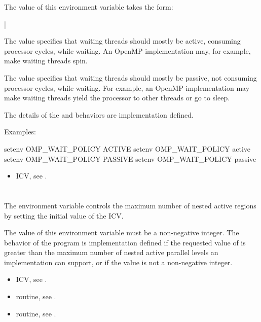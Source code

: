 The value of this environment variable takes the form:

{|}

The  value specifies that waiting threads should mostly be active, consuming
processor cycles, while waiting. An OpenMP implementation may, for example, make
waiting threads spin.

The  value specifies that waiting threads should mostly be passive, not
consuming processor cycles, while waiting. For example, an OpenMP implementation
may make waiting threads yield the processor to other threads or go to sleep.

The details of the  and  behaviors are implementation defined.

Examples:
\begin{ompEnv}
setenv OMP_WAIT_POLICY ACTIVE
setenv OMP_WAIT_POLICY active
setenv OMP_WAIT_POLICY PASSIVE
setenv OMP_WAIT_POLICY passive
\end{ompEnv}

\crossreferences
\begin{itemize}
\item {} ICV, see .
\end{itemize}










\section{}
\label{sec:OMP_MAX_ACTIVE_LEVELS}
The  environment variable controls the maximum number
of nested active  regions by setting the initial value of the
 ICV.

The value of this environment variable must be a non-negative integer. The
behavior of the program is implementation defined if the requested value of
 is greater than the maximum number of nested
active parallel levels an implementation can support, or if the value is not a
non-negative integer.

\crossreferences
\begin{itemize}
\item {} ICV, see .

\item {} routine, see .

\item {} routine, see .
\end{itemize}










